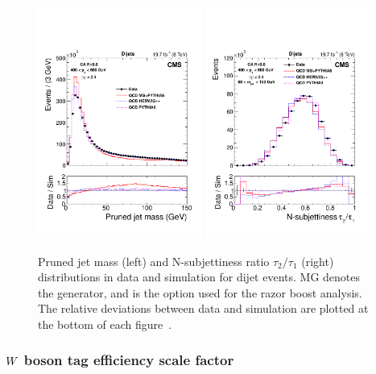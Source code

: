 \begin{figure}[htpb]
  \centering
  \includegraphics[width=0.48\textwidth]{figures/razor_wtag/substructure_pas_mass_2}
  \includegraphics[width=0.48\textwidth]{figures/razor_wtag/substructure_pas_tau21_aftermass_2}
  \caption{Pruned jet mass (left) and N-subjettiness ratio $\tau_2/\tau_1$ (right) distributions 
  in data and simulation for dijet events. MG denotes the \MADGRAPH generator, and is the option
used for the razor boost analysis. The relative deviations between
data and simulation are plotted at the bottom of each figure~\cite{Khachatryan:2014vla}. 
  \label{fig:boost_wtag_data_sim}}  
\end{figure}


\subsubsection{\texorpdfstring{$W$}{W} boson tag efficiency scale factor \label{sec:wtag_eff_sf}}

